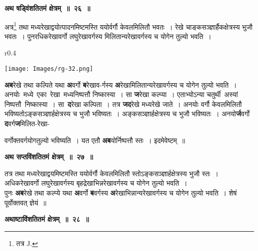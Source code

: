 \documentclass[11pt, openany]{book}
\begin{document}
\begin{center}
\textbf{\large अथ षड्विंशतितमं क्षेत्रम्~॥~२६~॥}
\end{center}

 {\ab अत्र\renewcommand{\thefootnote}{३}\footnote{तत्र {\en J.}} तथा मध्यरेखाद्वयोत्पादनमिष्टमस्ति ययोर्वर्गौ केवलमिलितौ भवतः~। रेखे चाङ्कसञ्ज्ञार्हैकक्षेत्रस्य भुजौ भवतः~। पुनरधिकरेखावर्गो लघुरेखावर्गस्य मिलितान्यरेखावर्गस्य च योगेन तुल्यो भवति~। }\\

\begin{wrapfigure}{r}{0.4\textwidth}
\vspace{-8mm}
\begin{center}
\texttt{[image: Images/rg-32.png]}
\end{center}
\vspace{-8mm}
\end{wrapfigure}

 \textbf{अब}रेखे तथा कल्पिते यथा \textbf{अ}वर्गो \textbf{ब}रेखाव-र्गस्य \textbf{अ}रेखामिलितान्यरेखावर्गस्य च योगेन तुल्यो भवति~। अनयोः \,मध्ये \,एका \,रेखा \,मध्यनिष्पत्तौ निष्कास्या~। सा \textbf{ज}रेखा कल्प्या~। एताभ्योऽन्या चतुर्थी \,अस्यां \,निष्पत्तौ \,निष्कास्या~। सा \,\textbf{द}रेखा कल्पिता~। तत्र \textbf{जद}रेखे मध्यरेखे जाते~। अनयोः वर्गौ केवलमिलितौ भविष्यतोऽङ्कसञ्ज्ञार्हक्षेत्रस्य च भुजौ भविष्यतः~। अङ्कसञ्ज्ञार्हक्षेत्रस्य च भुजौ भविष्यतः~। अनयो\textbf{र्ज}वर्गो \textbf{द}वर्ग\textbf{ज}मिलित-रेखा- 

\newpage
\noindent वर्गोक्तवर्गयोगतुल्यो भविष्यति~। यत एतौ \textbf{अब}योर्निष्पत्तौ स्तः~। इदमेवेष्टम्~॥ 
\vspace{2mm}

\begin{center}
\textbf{\large अथ सप्तविंशतितमं क्षेत्रम्~॥~२७~॥}
\end{center}

{\ab तत्र तथा मध्यरेखाद्वयमिष्टमस्ति ययोर्वर्गौ केवलमिलितौ स्तोऽङ्कसञ्ज्ञार्हक्षेत्रस्य भुजौ स्तः~। अधिकरेखावर्गो लघुरेखावर्गस्य बृहद्रेखाभिन्नरेखावर्गस्य च योगेन तुल्यो भवति~। }\\

 पुनः \textbf{अब}रेखे तथा कल्प्ये यथा \textbf{अ}वर्गो \textbf{ब}वर्गस्य \textbf{अ}रेखाभिन्नान्यरेखावर्गस्य च योगेन तुल्यो भवति~। शेषं पूर्वोक्तवत् ज्ञेयं~॥ 
\vspace{2mm}

\begin{center}
\textbf{\large अथाष्टाविंशतितमं क्षेत्रम्~॥~२८~॥}
\end{center}
\end{document}
